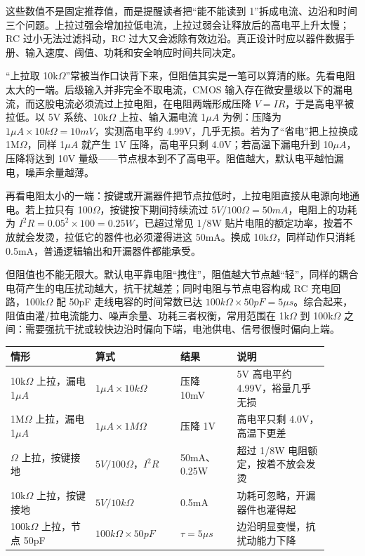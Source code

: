 这些数值不是固定推荐值，而是提醒读者把“能不能读到 1”拆成电流、边沿和时间三个问题。上拉过强会增加拉低电流，上拉过弱会让释放后的高电平上升太慢；RC 过小无法过滤抖动，RC 过大又会滤除有效边沿。真正设计时应以器件数据手册、输入速度、阈值、功耗和安全响应时间共同决定。

“上拉取 10k$\Omega$”常被当作口诀背下来，但阻值其实是一笔可以算清的账。先看电阻太大的一端。后级输入并非完全不取电流，CMOS 输入存在微安量级以下的漏电流，而这股电流必须流过上拉电阻，在电阻两端形成压降 $V=IR$，于是高电平被拉低。以 5V 系统、10k$\Omega$ 上拉、输入漏电流 1$\mu A$ 为例：压降为 $1\mu A \times 10k\Omega = 10mV$，实测高电平约 4.99V，几乎无损。若为了“省电”把上拉换成 1M$\Omega$，同样 1$\mu A$ 就产生 1V 压降，高电平只剩 4.0V；若高温下漏电升到 10$\mu A$，压降将达到 10V 量级——节点根本到不了高电平。阻值越大，默认电平越怕漏电，噪声余量越薄。

再看电阻太小的一端：按键或开漏器件把节点拉低时，上拉电阻直接从电源向地通电。若上拉只有 100$\Omega$，按键按下期间持续流过 $5V/100\Omega = 50mA$，电阻上的功耗为 $I^2R = 0.05^2 \times 100 = 0.25W$，已超过常见 1/8W 贴片电阻的额定功率，按着不放就会发烫，拉低它的器件也必须灌得进这 50mA。换成 10k$\Omega$，同样动作只消耗 0.5mA，普通逻辑输出和开漏器件都能承受。

但阻值也不能无限大。默认电平靠电阻“拽住”，阻值越大节点越“轻”，同样的耦合电荷产生的电压扰动越大，抗干扰越差；同时电阻与节点电容构成 RC 充电回路，100k$\Omega$ 配 50pF 走线电容的时间常数已达 $100k\Omega \times 50pF = 5\mu s$。综合起来，阻值由灌/拉电流能力、噪声余量、功耗三者权衡，常用范围在 1k$\Omega$ 到 100k$\Omega$ 之间：需要强抗干扰或较快边沿时偏向下端，电池供电、信号很慢时偏向上端。

\begin{longtable}{L{0.24\linewidth}L{0.24\linewidth}L{0.16\linewidth}L{0.26\linewidth}}
\toprule
情形 & 算式 & 结果 & 说明 \\
\midrule
10k$\Omega$ 上拉，漏电 1$\mu A$ & $1\mu A \times 10k\Omega$ & 压降 10mV & 5V 高电平约 4.99V，裕量几乎无损 \\\tablerowrule
1M$\Omega$ 上拉，漏电 1$\mu A$ & $1\mu A \times 1M\Omega$ & 压降 1V & 高电平只剩 4.0V，高温下更差 \\$\Omega$ 上拉，按键接地 & $5V/100\Omega$，$I^2R$ & 50mA、0.25W & 超过 1/8W 电阻额定，按着不放会发烫 \\\tablerowrule
10k$\Omega$ 上拉，按键接地 & $5V/10k\Omega$ & 0.5mA & 功耗可忽略，开漏器件也灌得起 \\\tablerowrule
100k$\Omega$ 上拉，节点 50pF & $100k\Omega \times 50pF$ & $\tau = 5\mu s$ & 边沿明显变慢，抗扰动能力下降 \\
\bottomrule
\end{longtable}

